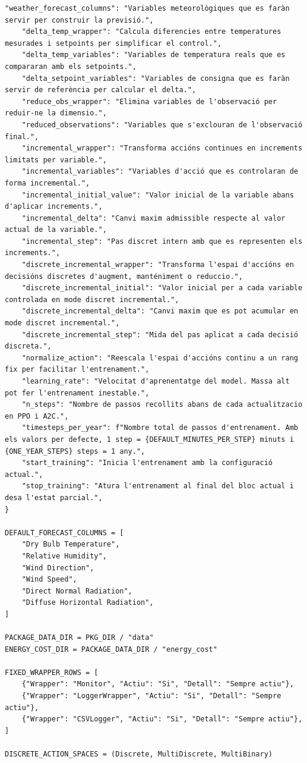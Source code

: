 \documentclass[10pt,a4paper]{article}
\begin{document}
\begin{lstlisting}[style=studioPython,caption={backend/entrenar\_agent\_constants.py},label={lst:backend-entrenar-agent-constants-py}]
    "weather_forecast_columns": "Variables meteorològiques que es faràn servir per construir la previsió.",
    "delta_temp_wrapper": "Calcula diferencies entre temperatures mesurades i setpoints per simplificar el control.",
    "delta_temp_variables": "Variables de temperatura reals que es compararan amb els setpoints.",
    "delta_setpoint_variables": "Variables de consigna que es faràn servir de referència per calcular el delta.",
    "reduce_obs_wrapper": "Elimina variables de l'observació per reduir-ne la dimensio.",
    "reduced_observations": "Variables que s'exclouran de l'observació final.",
    "incremental_wrapper": "Transforma accións continues en increments limitats per variable.",
    "incremental_variables": "Variables d'acció que es controlaran de forma incremental.",
    "incremental_initial_value": "Valor inicial de la variable abans d'aplicar increments.",
    "incremental_delta": "Canvi maxim admissible respecte al valor actual de la variable.",
    "incremental_step": "Pas discret intern amb que es representen els increments.",
    "discrete_incremental_wrapper": "Transforma l'espai d'accións en decisións discretes d'augment, manténiment o reduccio.",
    "discrete_incremental_initial": "Valor inicial per a cada variable controlada en mode discret incremental.",
    "discrete_incremental_delta": "Canvi maxim que es pot acumular en mode discret incremental.",
    "discrete_incremental_step": "Mida del pas aplicat a cada decisió discreta.",
    "normalize_action": "Reescala l'espai d'accións continu a un rang fix per facilitar l'entrenament.",
    "learning_rate": "Velocitat d'aprenentatge del model. Massa alt pot fer l'entrenament inestable.",
    "n_steps": "Nombre de passos recollits abans de cada actualitzacio en PPO i A2C.",
    "timesteps_per_year": f"Nombre total de passos d'entrenament. Amb els valors per defecte, 1 step = {DEFAULT_MINUTES_PER_STEP} minuts i {ONE_YEAR_STEPS} steps = 1 any.",
    "start_training": "Inicia l'entrenament amb la configuració actual.",
    "stop_training": "Atura l'entrenament al final del bloc actual i desa l'estat parcial.",
}

DEFAULT_FORECAST_COLUMNS = [
    "Dry Bulb Temperature",
    "Relative Humidity",
    "Wind Direction",
    "Wind Speed",
    "Direct Normal Radiation",
    "Diffuse Horizontal Radiation",
]

PACKAGE_DATA_DIR = PKG_DIR / "data"
ENERGY_COST_DIR = PACKAGE_DATA_DIR / "energy_cost"

FIXED_WRAPPER_ROWS = [
    {"Wrapper": "Monitor", "Actiu": "Si", "Detall": "Sempre actiu"},
    {"Wrapper": "LoggerWrapper", "Actiu": "Si", "Detall": "Sempre actiu"},
    {"Wrapper": "CSVLogger", "Actiu": "Si", "Detall": "Sempre actiu"},
]

DISCRETE_ACTION_SPACES = (Discrete, MultiDiscrete, MultiBinary)
\end{lstlisting}
\end{document}
